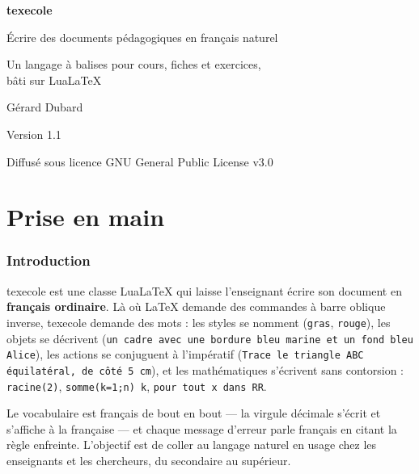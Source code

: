 \documentclass[11pt,a4paper]{article}
\newcommand{\bal}[1]{\texttt{#1}}
\begin{document}
\begin{titlepage}
\centering
\vspace*{3.5cm}
{\Huge\bfseries\color{Marine} texecole\par}
\vspace{0.8cm}
{\Large Écrire des documents pédagogiques en français naturel\par}
\vspace{2.5cm}
{\large Un langage à balises pour cours, fiches et exercices,\\[2pt]
bâti sur LuaLaTeX\par}
\vspace{3cm}
{\large Gérard Dubard\par}
\vspace{0.4cm}
{\large Version 1.1\par}
\vfill
{\small Diffusé sous licence GNU General Public License v3.0\par}
\end{titlepage}

\tableofcontents
\newpage

\part{Prise en main}

\section{Introduction}

texecole est une classe LuaLaTeX qui laisse l'enseignant écrire son
document en \textbf{français ordinaire}. Là où LaTeX demande des
commandes à barre oblique inverse, texecole demande des mots : les
styles se nomment (\bal{gras}, \bal{rouge}), les objets se décrivent
(\bal{un cadre avec une bordure bleu marine et un fond bleu Alice}), les
actions se conjuguent à l'impératif (\bal{Trace le triangle ABC
équilatéral, de côté 5 cm}), et les mathématiques s'écrivent sans
contorsion : \bal{racine(2)}, \bal{somme(k=1;n) k},
\bal{pour tout x dans RR}.

Le vocabulaire est français de bout en bout — la virgule décimale
s'écrit et s'affiche à la française — et chaque message d'erreur parle
français en citant la règle enfreinte. L'objectif est de coller au
langage naturel en usage chez les enseignants et les chercheurs, du
secondaire au supérieur.
\end{document}
